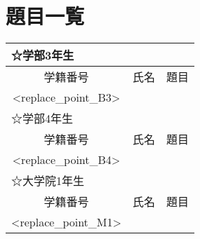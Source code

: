 \documentclass[11pt]{jarticle}
\begin{document}
\thispagestyle{empty}

\section*{題目一覧}

\begin{table}[htb]
\begin{tabular}{|c|c|p{31em}|}

\multicolumn{3}{l}{☆学部3年生} \\
\hline
学籍番号 & 氏名 & 題目 \\
\hline
<replace_point_B3>
\multicolumn{3}{l}{} \\


\multicolumn{3}{l}{☆学部4年生} \\
\hline
学籍番号 & 氏名 & 題目 \\
\hline
<replace_point_B4>
\multicolumn{3}{l}{} \\

\multicolumn{3}{l}{☆大学院1年生} \\
\hline
学籍番号 & 氏名 & 題目 \\
\hline
<replace_point_M1>
\multicolumn{3}{l}{} \\

\end{tabular}
\end{table}
\end{document}
